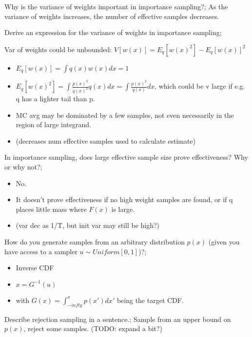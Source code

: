 \documentclass{article}
\begin{document}
Why is the variance of weights important in importance sampling?; As the variance of weights increases, the number of effective samples decreases.

Derive an expression for the variance of weights in importance sampling; \item Var of weights could be unbounded: $V[w(x)] = E_q[w(x)^2] - E_q[w(x)]^2$
    \begin{itemize}
        \item $E_q[w(x)] = \int q(x)w(x)dx = 1$
        \item $E_q[w(x)^2] = \int \frac{p(x)^2}{q(x)^2}q(x)dx = \int \frac{p(x)^2}{q(x)}dx$, which could be v large if e.g. q has a lighter tail than p. 
        \item MC avg may be dominated by a few samples, not even necessarily in the region of large integrand.
        \item (decreases num effective samples used to calculate estimate)
    \end{itemize}

In importance sampling, does large effective sample size prove effectiveness? Why or why not?; \begin{itemize}
    \item No.
    \item It doesn't prove effectiveness if no high weight samples are found, or if q places little mass where $F(x)$ is large.
    \item (var dec as 1/T, but init var may still be high?)
\end{itemize}

How do you generate samples from an arbitrary distribution $p(x)$ (given you have access to a sampler $u\sim Uniform[0,1]$)?; \begin{itemize}
    \item Inverse CDF
    \item $x = G^{-1}(u)$
    \item with $G(x) = \int_{-infty}^x p(x')dx'$ being the target CDF.
\end{itemize}

Describe rejection sampling in a sentence.; Sample from an upper bound on $p(x)$, reject some samples. (TODO: expand a bit?)
\end{document}
